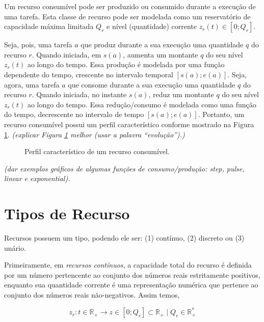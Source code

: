         Um recurso consumível pode ser produzido ou consumido durante a execução de uma tarefa. Esta classe de recurso pode ser modelada como um reservatório de capacidade máxima limitada $Q_r$ e nível (quantidade) corrente $z_r(t) \in [0; Q_r]$.
        
        Seja, pois, uma tarefa $a$ que produz durante a sua execução uma quantidade $q$ do recurso $r$. Quando iniciada, em $s(a)$, aumenta um montante $q$ do seu nível $z_r(t)$ ao longo do tempo. Essa produção é modelada por uma função dependente do tempo, crescente no intervalo temporal $[s(a); e(a)]$. Seja, agora, uma tarefa $a$ que consome durante a sua execução uma quantidade $q$ do recurso $r$. Quando iniciada, no instante $s(a)$, reduz um montante $q$ do seu nível $z_r(t)$ ao longo do tempo. Essa redução/consumo é modelada como uma função do tempo, decrescente no intervalo de tempo $[s(a); e(a)]$. Portanto, um recurso consumível possui um perfil característico conforme mostrado na Figura \ref{fig:recurso_consumivel}. \emph{\color{red} (explicar Figura \ref{fig:recurso_consumivel} melhor (usar a palavra ``evolução'').)}
        
        \begin{figure}
            \centering
            
            \caption{Perfil característico de um recurso consumível.} \label{fig:recurso_consumivel}
        \end{figure}
        
        \emph{\color{red} (dar exemplos gráficos de algumas funções de consumo/produção: \textit{step}, \textit{pulse}, \textit{linear} e \textit{exponential}). }
        
    
    \section{Tipos de Recurso} \label{sec:tipos_recurso}
    
        Recursos possuem um tipo, podendo ele ser: (1) contínuo, (2) discreto ou (3) unário. 
        
        Primeiramente, em \textit{recursos contínuos}, a capacidade total do recurso é definida por um número pertencente ao conjunto dos números reais estritamente positivos, enquanto sua quantidade corrente é uma representação numérica que pertence ao conjunto dos números reais não-negativos. Assim temos, 
        
        \begin{equation} \label{eq:recurso_continuo}
            z_r: t \in \mathbb{R}_+ \to z \in [0; Q_r] \subset \mathbb{R}_+ \mid Q_r \in \mathbb{R}_+^*
        \end{equation}
        
